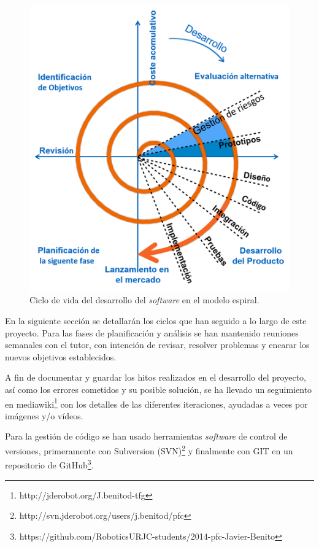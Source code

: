 \begin{figure}[th]
\centering
\includegraphics[scale=0.62]{Figures/spiral.png}
\decoRule
\caption[Ciclo de vida en espiral]{Ciclo de vida del desarrollo del \textit{software} en el modelo espiral.}
\label{fig:spiral}
\end{figure}

En la siguiente sección se detallarán los ciclos que han seguido a lo largo de este proyecto. Para las fases de planificación y análisis se han mantenido reuniones semanales con el tutor, con intención de revisar, resolver problemas y encarar los nuevos objetivos establecidos.

A fin de documentar y guardar los hitos realizados en el desarrollo del proyecto, así como los errores cometidos y su posible solución, se ha llevado un seguimiento en mediawiki\footnote{http://jderobot.org/J.benitod-tfg} con los detalles de las diferentes iteraciones, ayudadas a veces por imágenes y/o vídeos.

Para la gestión de código se han usado herramientas \textit{software} de control de versiones, primeramente con Subversion (SVN)\footnote{http://svn.jderobot.org/users/j.benitod/pfc} y finalmente con GIT en un repositorio de GitHub\footnote{https://github.com/RoboticsURJC-students/2014-pfc-Javier-Benito}.

